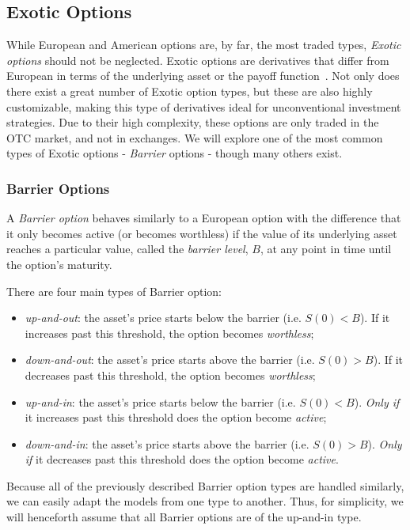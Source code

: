 \subsection{Exotic Options}
While European and American options are, by far, the most traded types, \emph{Exotic options} should not be neglected. Exotic options are derivatives that differ from European in terms of the underlying asset or the payoff function~\citep{InvExotic}.
Not only does there exist a great number of Exotic option types, but these are also highly customizable, making this type of derivatives ideal for unconventional investment strategies. Due to their high complexity, these options are only traded in the OTC market, and not in exchanges. We will explore one of the most common types of Exotic options - \emph{Barrier} options - though many others exist.


\subsubsection{Barrier Options}
\label{subsubsection:Barrier Options}
A \emph{Barrier option} behaves similarly to a European option with the difference that it only becomes active (or becomes worthless) if the value of its underlying asset reaches a particular value, called the \emph{barrier level}, $B$, at any point in time until the option's maturity.

There are four main types of Barrier option:
\begin{itemize}
\item \emph{up-and-out}: the asset's price starts below the barrier (i.e. $S(0)<B$). If it increases past this threshold, the option becomes \emph{worthless};
\item \emph{down-and-out}: the asset's price starts above the barrier (i.e. $S(0)>B$). If it decreases past this threshold, the option becomes \emph{worthless};
\item \emph{up-and-in}: the asset's price starts below the barrier (i.e. $S(0)<B$). \emph{Only if} it increases past this threshold does the option become \emph{active};
\item \emph{down-and-in}: the asset's price starts above the barrier (i.e. $S(0)>B$). \emph{Only if} it decreases past this threshold does the option become \emph{active}.
\end{itemize}

Because all of the previously described Barrier option types are handled similarly, we can easily adapt the models from one type to another. Thus, for simplicity, we will henceforth assume that all Barrier options are of the up-and-in type.

